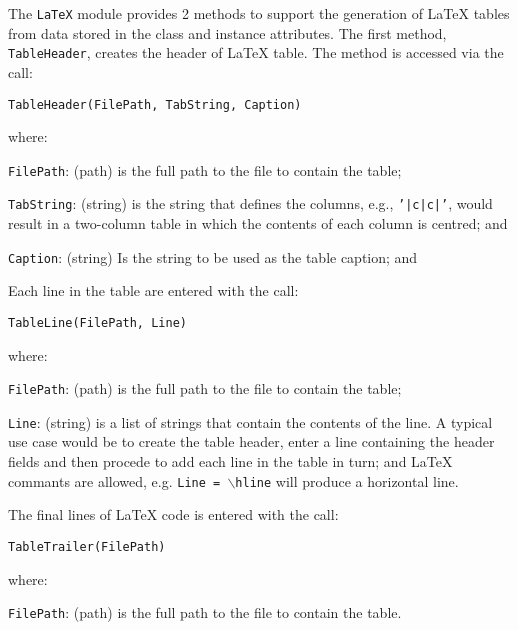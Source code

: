 The \texttt{LaTeX} module provides 2 methods to support the generation
of LaTeX tables from data stored in the class and instance attributes.
The first method, \texttt{TableHeader}, creates the header of LaTeX
table.
The method is accessed via the call:
\begin{center}
  \texttt{TableHeader(FilePath, TabString, Caption)}
\end{center}
where:
\begin{description}
  \item{\texttt{FilePath}}: (path) is the full path to the file to
    contain the table;
  \item{\texttt{TabString}}: (string) is the string that defines the
    columns, e.g., \texttt{'|c|c|'}, would result in a two-column
    table in which the contents of each column is centred; and
  \item{\texttt{Caption}}: (string) Is the string to be used as the
    table caption; and
\end{description}
Each line in the table are entered with the call:
\begin{center}
  \texttt{TableLine(FilePath, Line)}
\end{center}
where:
\begin{description}
  \item{\texttt{FilePath}}: (path) is the full path to the file to
    contain the table;
  \item{\texttt{Line}}: (string) is a list of strings that contain the
    contents of the line.
    A typical use case would be to create the table header, enter a
    line containing the header fields and then procede to add each
    line in the table in turn; and
    LaTeX commants are allowed, e.g. \texttt{Line = $\backslash$hline}
    will produce a horizontal line.
\end{description}
The final lines of LaTeX code is entered with the call:
\begin{center}
  \texttt{TableTrailer(FilePath)}
\end{center}
where:
\begin{description}
  \item{\texttt{FilePath}}: (path) is the full path to the file to
    contain the table.
\end{description}

\FloatBarrier
